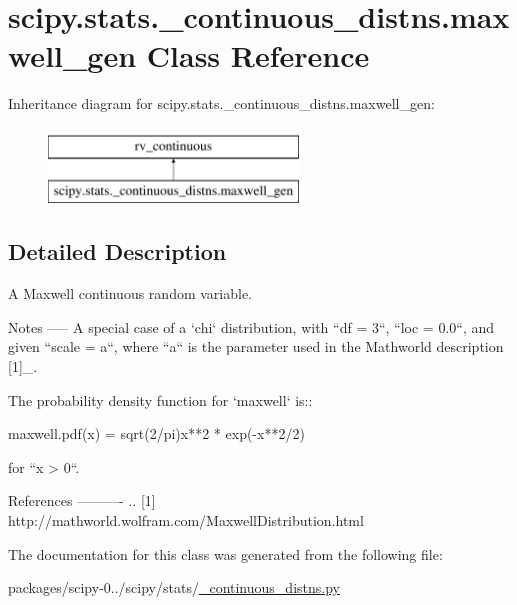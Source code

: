 \hypertarget{classscipy_1_1stats_1_1__continuous__distns_1_1maxwell__gen}{}\section{scipy.\+stats.\+\_\+continuous\+\_\+distns.\+maxwell\+\_\+gen Class Reference}
\label{classscipy_1_1stats_1_1__continuous__distns_1_1maxwell__gen}
Inheritance diagram for scipy.\+stats.\+\_\+continuous\+\_\+distns.\+maxwell\+\_\+gen\+:\begin{figure}[H]
\begin{center}
\leavevmode
\includegraphics[height=2.000000cm]{classscipy_1_1stats_1_1__continuous__distns_1_1maxwell__gen}
\end{center}
\end{figure}


\subsection{Detailed Description}
\begin{DoxyVerb}A Maxwell continuous random variable.


Notes
-----
A special case of a `chi` distribution,  with ``df = 3``, ``loc = 0.0``,
and given ``scale = a``, where ``a`` is the parameter used in the
Mathworld description [1]_.

The probability density function for `maxwell` is::

    maxwell.pdf(x) = sqrt(2/pi)x**2 * exp(-x**2/2)

for ``x > 0``.

References
----------
.. [1] http://mathworld.wolfram.com/MaxwellDistribution.html

\end{DoxyVerb}
 

The documentation for this class was generated from the following file\+:\begin{DoxyCompactItemize}
\item 
packages/scipy-\/0../scipy/stats/\hyperlink{__continuous__distns_8py}{\+\_\+continuous\+\_\+distns.\+py}\end{DoxyCompactItemize}
